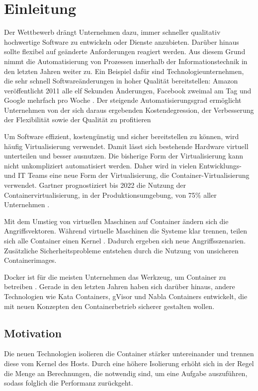 \chapter{Einleitung}
\label{ch:intro}

Der Wettbewerb drängt Unternehmen dazu, immer schneller qualitativ hochwertige Software zu entwickeln oder Dienste anzubieten. Darüber hinaus sollte flexibel auf geänderte Anforderungen reagiert werden. Aus diesem Grund nimmt die Automatisierung von Prozessen innerhalb der Informationstechnik in den letzten Jahren weiter zu. Ein Beispiel dafür sind Technologieunternehmen, die sehr schnell Softwareänderungen in hoher Qualität bereitstellen: Amazon veröffentlicht 2011 alle elf Sekunden Änderungen, Facebook zweimal am Tag und Google mehrfach pro Woche \cite[vgl.][]{JezHumble.2014}. Der steigende Automatisierungsgrad ermöglicht Unternehmen von der sich daraus ergebenden Kostendegression, der Verbesserung der Flexibilität sowie der Qualität zu profitieren

Um Software effizient, kostengünstig und sicher bereitstellen zu können, wird häufig Virtualisierung verwendet. Damit lässt sich bestehende Hardware virtuell unterteilen und besser ausnutzen. Die bisherige Form der Virtualisierung kann nicht unkompliziert automatisiert werden. Daher wird in vielen Entwicklungs- und IT Teams eine neue Form der Virtualisierung, die Container-Virtualisierung verwendet. Gartner prognostiziert bis 2022 die Nutzung der Containervirtualisierung, in der Produktionsumgebung, von 75\% aller Unternehmen \cite[vgl.][]{ArunChandrasekaran.20190215}.

Mit dem Umstieg von virtuellen Maschinen auf Container ändern sich die Angriffsvektoren. Während virtuelle Maschinen die Systeme klar trennen, teilen sich alle Container einen Kernel \cite[vgl.][6]{Scholl.2019}. Dadurch ergeben sich neue Angriffsszenarien. Zusätzliche Sicherheitsprobleme entstehen durch die Nutzung von unsicheren Containerimages.

Docker ist für die meisten Unternehmen das Werkzeug, um Container zu betreiben \cite[vgl.][5]{sysdig.2019}. Gerade in den letzten Jahren haben sich darüber hinaus, andere Technologien wie Kata Containers, gVisor und Nabla Containers entwickelt, die mit neuen Konzepten den Containerbetrieb sicherer gestalten
wollen.

%
%
\section{Motivation}
\label{sec:motivation}
Die neuen  Technologien isolieren die Container stärker untereinander und trennen diese vom Kernel des Hosts. Durch eine höhere Isolierung erhöht sich in der Regel die Menge an Berechnungen, die notwendig sind, um eine Aufgabe auszuführen, sodass folglich die Performanz zurückgeht.

